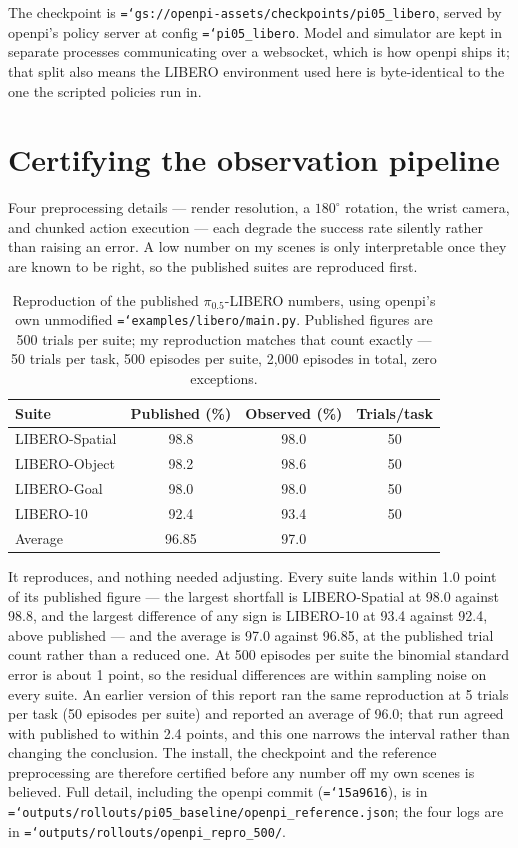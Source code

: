 \documentclass[11pt,a4paper]{article}
\newcommand{\code}[1]{\texttt{\small\hyphenchar\font=`\-\relax #1}}
\begin{document}
The checkpoint is \code{gs://openpi-assets/checkpoints/pi05\_libero}, served by
openpi's policy server at config \code{pi05\_libero}. Model and simulator are
kept in separate processes communicating over a websocket, which is how openpi
ships it; that split also means the LIBERO environment used here is
byte-identical to the one the scripted policies run in.

\section{Certifying the observation pipeline}

Four preprocessing details --- render resolution, a $180^{\circ}$ rotation, the
wrist camera, and chunked action execution --- each degrade the success rate
silently rather than raising an error. A low number on my scenes is only
interpretable once they are known to be right, so the published suites are
reproduced first.

\begin{table}[h]
\centering
\caption{Reproduction of the published $\pi_{0.5}$-LIBERO numbers, using openpi's
own unmodified \code{examples/libero/main.py}. Published figures are 500 trials
per suite; my reproduction matches that count exactly --- 50 trials per task,
500 episodes per suite, 2{,}000 episodes in total, zero exceptions.}
\begin{tabular}{lccc}
\toprule
Suite & Published (\%) & Observed (\%) & Trials/task \\
\midrule
LIBERO-Spatial & 98.8 & 98.0 & 50 \\
LIBERO-Object  & 98.2 & 98.6 & 50 \\
LIBERO-Goal    & 98.0 & 98.0 & 50 \\
LIBERO-10      & 92.4 & 93.4 & 50 \\
\midrule
Average        & 96.85 & 97.0 & \\
\bottomrule
\end{tabular}
\end{table}

\noindent
It reproduces, and nothing needed adjusting. Every suite lands within 1.0 point
of its published figure --- the largest shortfall is LIBERO-Spatial at 98.0
against 98.8, and the largest difference of any sign is LIBERO-10 at 93.4
against 92.4, above published --- and the average is 97.0 against 96.85, at the
published trial count rather than a reduced one. At 500 episodes per suite the
binomial standard error is about 1 point, so the residual differences are within
sampling noise on every suite. An earlier version of this report ran the same
reproduction at 5 trials per task (50 episodes per suite) and reported an average
of 96.0; that run agreed with published to within 2.4 points, and this one
narrows the interval rather than changing the conclusion. The install, the
checkpoint and the reference preprocessing are therefore certified before any
number off my own scenes is believed. Full detail, including the openpi commit
(\code{15a9616}), is in \code{outputs/rollouts/pi05\_baseline/openpi\_reference.json};
the four logs are in \code{outputs/rollouts/openpi\_repro\_500/}.
\end{document}
